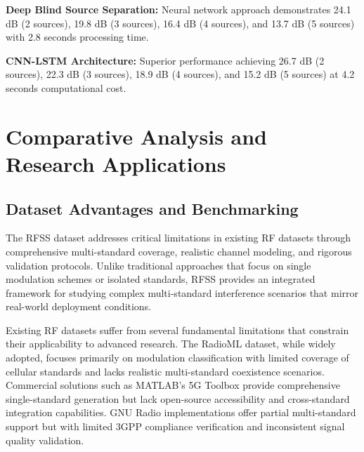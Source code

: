 \documentclass[twocolumn]{article}
\begin{document}
\textbf{Deep Blind Source Separation:} Neural network approach demonstrates 24.1 dB (2 sources), 19.8 dB (3 sources), 16.4 dB (4 sources), and 13.7 dB (5 sources) with 2.8 seconds processing time.

\textbf{CNN-LSTM Architecture:} Superior performance achieving 26.7 dB (2 sources), 22.3 dB (3 sources), 18.9 dB (4 sources), and 15.2 dB (5 sources) at 4.2 seconds computational cost.

\section{Comparative Analysis and Research Applications}

\subsection{Dataset Advantages and Benchmarking}

The RFSS dataset addresses critical limitations in existing RF datasets through comprehensive multi-standard coverage, realistic channel modeling, and rigorous validation protocols. Unlike traditional approaches that focus on single modulation schemes or isolated standards, RFSS provides an integrated framework for studying complex multi-standard interference scenarios that mirror real-world deployment conditions.

Existing RF datasets suffer from several fundamental limitations that constrain their applicability to advanced research. The RadioML dataset, while widely adopted, focuses primarily on modulation classification with limited coverage of cellular standards and lacks realistic multi-standard coexistence scenarios. Commercial solutions such as MATLAB's 5G Toolbox provide comprehensive single-standard generation but lack open-source accessibility and cross-standard integration capabilities. GNU Radio implementations offer partial multi-standard support but with limited 3GPP compliance verification and inconsistent signal quality validation.
\end{document}
